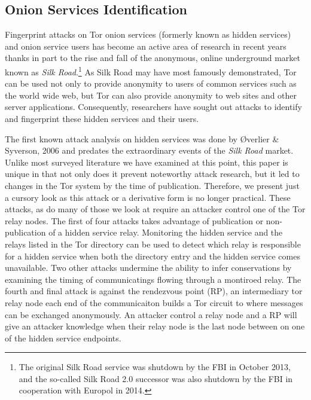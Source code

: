 \documentclass[sigconf]{acmart}
\begin{document}
\subsection{Onion Services Identification}

Fingerprint attacks on Tor onion services (formerly known as hidden
services) and onion service users has become an active area of research
in recent years thanks in part to the rise and fall of the anonymous,
online underground market known as \emph{Silk Road}.\footnote{The
original Silk Road service was shutdown by the FBI in October 2013, and
the so-called Silk Road 2.0 successor was also shutdown by the FBI in
cooperation with Europol in 2014.}  As Silk Road may have most famously
demonstrated, Tor can be used not only to provide anonymity to users of
common services such as the world wide web, but Tor can also provide
anonymity to web sites and other server applications.  Consequently,
researchers have sought out attacks to identify and fingerprint these
hidden services and their users.

The first known attack analysis on hidden services was done by
{\O}verlier \& Syverson, 2006 \cite{overlier_locating_2006} and predates
the extraordinary events of the \emph{Silk Road} market.  Unlike
most surveyed literature we have examined at this point, this paper is
unique in that not only does it prevent noteworthy attack research, but
it led to changes in the Tor system by the time of publication.
Therefore, we present just a cursory look as this attack or a derivative
form is no longer practical.  These attacks, as do many of those we look
at require an attacker control one of the Tor relay nodes.  The first of
four attacks takes advantage of publication or non-publication of a
hidden service relay.  Monitoring the hidden service and the relays
listed in the Tor directory can be used to detect which relay is
responsible for a hidden service when both the directory entry and the
hidden service comes unavailable.  Two other attacks undermine the
ability to infer conservations by examining the timing of communicatings
flowing through a montiroed relay.  The fourth and final attack is
against the rendezvous point (RP), an intermediary tor relay node each
end of the communicaiton builds a Tor circuit to where messages can be
exchanged anonymously.  An attacker control a relay node and a RP will
give an attacker knowledge when their relay node is the last node
between on one of the hidden service endpoints.
\end{document}
